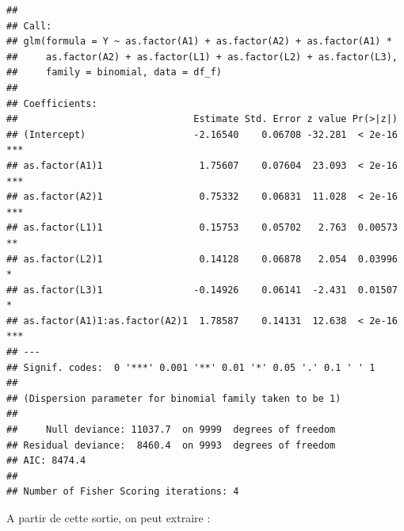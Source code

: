 \documentclass[
]{book}
\begin{document}
\begin{verbatim}
## 
## Call:
## glm(formula = Y ~ as.factor(A1) + as.factor(A2) + as.factor(A1) * 
##     as.factor(A2) + as.factor(L1) + as.factor(L2) + as.factor(L3), 
##     family = binomial, data = df_f)
## 
## Coefficients:
##                               Estimate Std. Error z value Pr(>|z|)    
## (Intercept)                   -2.16540    0.06708 -32.281  < 2e-16 ***
## as.factor(A1)1                 1.75607    0.07604  23.093  < 2e-16 ***
## as.factor(A2)1                 0.75332    0.06831  11.028  < 2e-16 ***
## as.factor(L1)1                 0.15753    0.05702   2.763  0.00573 ** 
## as.factor(L2)1                 0.14128    0.06878   2.054  0.03996 *  
## as.factor(L3)1                -0.14926    0.06141  -2.431  0.01507 *  
## as.factor(A1)1:as.factor(A2)1  1.78587    0.14131  12.638  < 2e-16 ***
## ---
## Signif. codes:  0 '***' 0.001 '**' 0.01 '*' 0.05 '.' 0.1 ' ' 1
## 
## (Dispersion parameter for binomial family taken to be 1)
## 
##     Null deviance: 11037.7  on 9999  degrees of freedom
## Residual deviance:  8460.4  on 9993  degrees of freedom
## AIC: 8474.4
## 
## Number of Fisher Scoring iterations: 4
\end{verbatim}

A partir de cette sortie, on peut extraire :
\end{document}
